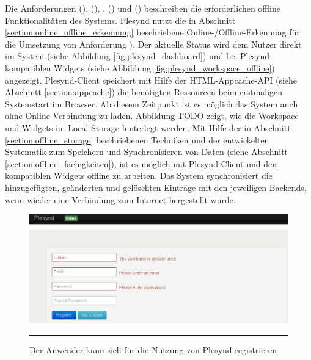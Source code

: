 Die Anforderungen  (\emph{\requirementCheckOnlineStatus}),  (\emph{\requirementOnlineStatusInformUser}),  \emph{\requirementOfflineStart},  (\emph{\requirementOfflineWork}) und  (\emph{\requirementOnlineSync}) beschreiben die erforderlichen offline Funktionalitäten des Systems. Plesynd nutzt die in Abschnitt \ref{section:online_offline_erkennung} beschriebene Online-/Offline-Erkennung für die Umsetzung von Anforderung ). Der aktuelle Status wird dem Nutzer direkt im System (siehe Abbildung \ref{fig:plesynd_dashboard}) und bei Plesynd-kompatiblen Widgets (siehe Abbildung \ref{fig:plesynd_workspace_offline}) angezeigt. Plesynd-Client speichert mit Hilfe der HTML-Appcache-API (siehe Abschnitt \ref{section:appcache}) die benötigten Ressourcen beim erstmaligen Systemstart im Browser. Ab diesem Zeitpunkt ist es möglich das System auch ohne Online-Verbindung zu laden. Abbildung TODO zeigt, wie die Workspace und Widgets im Local-Storage hinterlegt werden. Mit Hilfe der in Abschnitt \ref{section:offline_storage} beschriebenen Techniken und der entwickelten Systematik zum Speichern und Synchronisieren von Daten (siehe Abschnitt \ref{section:offline_faehigkeiten}), ist es möglich mit Plesynd-Client und den kompatiblen Widgets offline zu arbeiten. Das System synchronisiert die hinzugefügten, geänderten und gelöschten Einträge mit den jeweiligen Backends, wenn wieder eine Verbindung zum Internet hergestellt wurde.


\begin{figure}[hb]
  \centering
  \includegraphics[]{./Figures/plesynd_register.png}
    \rule{35em}{0.5pt}
  \caption[Plesynd User"=Interface: Registrieren]{Der Anwender kann sich für die Nutzung von Plesynd registrieren}
  \label{fig:plesynd_register}
\end{figure}

